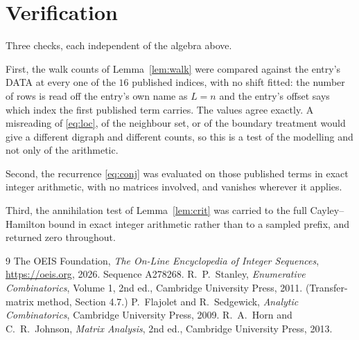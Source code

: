 \documentclass[11pt,a4paper]{article}
\theoremstyle{plain}
\theoremstyle{definition}
\begin{document}
\section{Verification}

Three checks, each independent of the algebra above.

First, the walk counts of Lemma~\ref{lem:walk} were compared against the entry's DATA at
every one of the $16$ published indices, with no shift fitted: the number of rows is
read off the entry's own name as $L=n$ and the entry's offset says which index the first
published term carries. The values agree exactly. A misreading of \eqref{eq:loc}, of the
neighbour set, or of the boundary treatment would give a different digraph and different
counts, so this is a test of the modelling and not only of the arithmetic.

Second, the recurrence \eqref{eq:conj} was evaluated on those published terms in exact
integer arithmetic, with no matrices involved, and vanishes wherever it applies.

Third, the annihilation test of Lemma~\ref{lem:crit} was carried to the full
Cayley--Hamilton bound in exact integer arithmetic rather than to a sampled prefix, and
returned zero throughout.

\begin{thebibliography}{9}
 The OEIS Foundation, \emph{The On-Line Encyclopedia of Integer
Sequences}, \url{https://oeis.org}, 2026. Sequence A278268.
 R.~P.~Stanley, \emph{Enumerative Combinatorics}, Volume 1, 2nd ed.,
Cambridge University Press, 2011. (Transfer-matrix method, Section 4.7.)
 P.~Flajolet and R.~Sedgewick, \emph{Analytic Combinatorics}, Cambridge
University Press, 2009.
 R.~A.~Horn and C.~R.~Johnson, \emph{Matrix Analysis}, 2nd ed., Cambridge
University Press, 2013.
\end{thebibliography}
\end{document}
